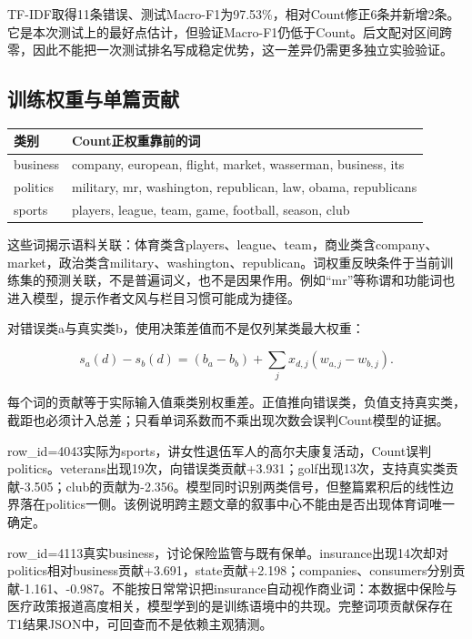 \documentclass[UTF8,a4paper,11pt,fontset=fandol]{ctexart}
\begin{document}
TF-IDF取得11条错误、测试Macro-F1为97.53\%，相对Count修正6条并新增2条。它是本次测试上的最好点估计，但验证Macro-F1仍低于Count。后文配对区间跨零，因此不能把一次测试排名写成稳定优势，这一差异仍需更多独立实验验证。

\subsection{训练权重与单篇贡献}
\begin{center}\begin{minipage}{\linewidth}\small
\setlength{\tabcolsep}{4pt}
\renewcommand{\arraystretch}{1.22}
\begin{tabular}{>{\raggedright\arraybackslash}p{}>{\raggedright\arraybackslash}p{}}
\toprule
\textbf{类别} & \textbf{Count正权重靠前的词} \\
\midrule
business & company, european, flight, market, wasserman, business, its \\
politics & military, mr, washington, republican, law, obama, republicans \\
sports & players, league, team, game, football, season, club \\
\bottomrule
\end{tabular}
\end{minipage}\end{center}
这些词揭示语料关联：体育类含players、league、team，商业类含company、market，政治类含military、washington、republican。词权重反映条件于当前训练集的预测关联，不是普遍词义，也不是因果作用。例如“mr”等称谓和功能词也进入模型，提示作者文风与栏目习惯可能成为捷径。

对错误类a与真实类b，使用决策差值而不是仅列某类最大权重：

\[
s_a(d)-s_b(d)=(b_a-b_b)+\sum_j x_{d,j}(w_{a,j}-w_{b,j}).
\]

每个词的贡献等于实际输入值乘类别权重差。正值推向错误类，负值支持真实类，截距也必须计入总差；只看单词系数而不乘出现次数会误判Count模型的证据。

row\_\allowbreak{}id=4043实际为sports，讲女性退伍军人的高尔夫康复活动，Count误判politics。veterans出现19次，向错误类贡献+3.931；golf出现13次，支持真实类贡献-3.505；club的贡献为-2.356。模型同时识别两类信号，但整篇累积后的线性边界落在politics一侧。该例说明跨主题文章的叙事中心不能由是否出现体育词唯一确定。

row\_\allowbreak{}id=4113真实business，讨论保险监管与既有保单。insurance出现14次却对politics相对business贡献+3.691，state贡献+2.198；companies、consumers分别贡献-1.161、-0.987。不能按日常常识把insurance自动视作商业词：本数据中保险与医疗政策报道高度相关，模型学到的是训练语境中的共现。完整词项贡献保存在T1结果JSON中，可回查而不是依赖主观猜测。
\end{document}
